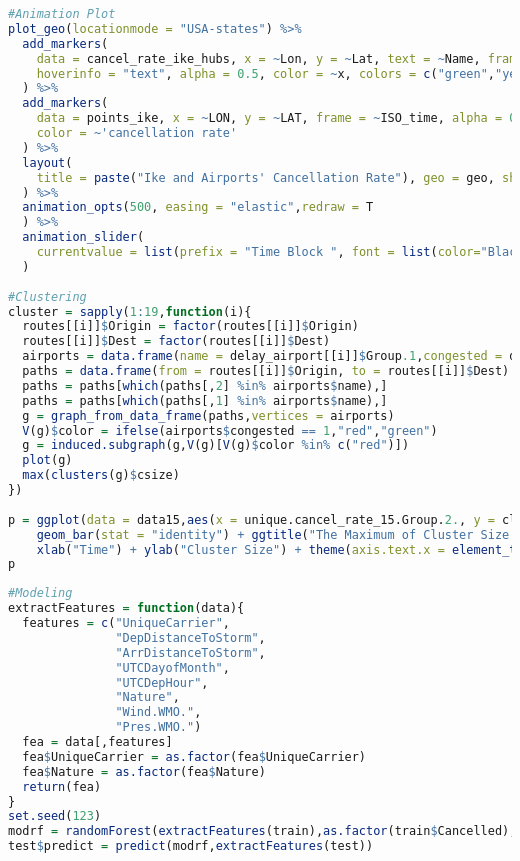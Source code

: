 \documentclass[12pt]{article}
\begin{document}
\begin{lstlisting}[language=R, caption=Animation Plot in R]
#Animation Plot
plot_geo(locationmode = "USA-states") %>%
  add_markers(
    data = cancel_rate_ike_hubs, x = ~Lon, y = ~Lat, text = ~Name, frame = ~Group.2,
    hoverinfo = "text", alpha = 0.5, color = ~x, colors = c("green","yellow","orange","red","maroon")
  ) %>% 
  add_markers(
    data = points_ike, x = ~LON, y = ~LAT, frame = ~ISO_time, alpha = 0.3, size = ~INTENSITY, 
    color = ~'cancellation rate'
  ) %>%
  layout(
    title = paste("Ike and Airports' Cancellation Rate"), geo = geo, showlegend = FALSE
  ) %>%
  animation_opts(500, easing = "elastic",redraw = T
  ) %>%
  animation_slider(
    currentvalue = list(prefix = "Time Block ", font = list(color="Black"))
  )
 
#Clustering
cluster = sapply(1:19,function(i){
  routes[[i]]$Origin = factor(routes[[i]]$Origin)
  routes[[i]]$Dest = factor(routes[[i]]$Dest)
  airports = data.frame(name = delay_airport[[i]]$Group.1,congested = delay_airport[[i]]$congested)
  paths = data.frame(from = routes[[i]]$Origin, to = routes[[i]]$Dest)
  paths = paths[which(paths[,2] %in% airports$name),]
  paths = paths[which(paths[,1] %in% airports$name),]
  g = graph_from_data_frame(paths,vertices = airports)
  V(g)$color = ifelse(airports$congested == 1,"red","green")
  g = induced.subgraph(g,V(g)[V(g)$color %in% c("red")])
  plot(g)
  max(clusters(g)$csize)
})
 
p = ggplot(data = data15,aes(x = unique.cancel_rate_15.Group.2., y = cluster_15)) + 
    geom_bar(stat = "identity") + ggtitle("The Maximum of Cluster Size at Different Time of OCT 15") +
    xlab("Time") + ylab("Cluster Size") + theme(axis.text.x = element_text(angle = 90, hjust = 1))
p
\end{lstlisting}
\begin{lstlisting}[language=R, caption=Random Forest in R] 
#Modeling
extractFeatures = function(data){
  features = c("UniqueCarrier",
               "DepDistanceToStorm",
               "ArrDistanceToStorm",
               "UTCDayofMonth",
               "UTCDepHour",
               "Nature",
               "Wind.WMO.",
               "Pres.WMO.")
  fea = data[,features]
  fea$UniqueCarrier = as.factor(fea$UniqueCarrier)
  fea$Nature = as.factor(fea$Nature)
  return(fea)
}
set.seed(123)
modrf = randomForest(extractFeatures(train),as.factor(train$Cancelled),ntree = 1000,importance = T)
test$predict = predict(modrf,extractFeatures(test))
\end{lstlisting}
\end{document}
